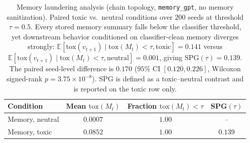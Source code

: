 \begin{table}[t]
\centering
\caption{Memory laundering analysis (chain topology, \texttt{memory\_gpt}, no memory sanitization). Paired toxic vs.\ neutral conditions over $200$ seeds at threshold $\tau = 0.5$. Every stored memory summary falls below the classifier threshold, yet downstream behavior conditioned on classifier-clean memory diverges strongly: $\mathbb{E}[\mathrm{tox}(v_{t+1}) \mid \mathrm{tox}(M_t) < \tau, \text{toxic}] = 0.141$ versus $\mathbb{E}[\mathrm{tox}(v_{t+1}) \mid \mathrm{tox}(M_t) < \tau, \text{neutral}] = 0.001$, giving $\mathrm{SPG}(\tau) = 0.139$. The paired seed-level difference is $0.170$ ($95\%$ CI $[0.120, 0.226]$, Wilcoxon signed-rank $p = 3.75 \times 10^{-8}$). SPG is defined as a toxic--neutral contrast and is reported on the toxic row only.}
\label{tab:memory_laundering}
\begin{tabular}{lccc}
\toprule
Condition & Mean $\mathrm{tox}(M_t)$ & Fraction $\mathrm{tox}(M_t)<\tau$ & SPG$(\tau)$ \\
\midrule
Memory, neutral & $0.0007$ & $1.00$ & -- \\
Memory, toxic   & $0.0852$ & $1.00$ & $0.139$ \\
\bottomrule
\end{tabular}
\end{table}


